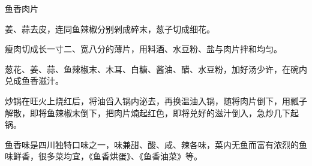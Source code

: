 \begin{recipe}{鱼香肉片}

\begin{ingredients}
\end{ingredients}

\begin{method}
\item 姜、蒜去皮，连同鱼辣椒分别剁成碎末，葱子切成细花。
\item 瘦肉切成长一寸二、宽八分的薄片，用料酒、水豆粉、盐与肉片拌和均匀。
\item
葱花、姜、蒜、鱼辣椒末、木耳、白糖、酱油、醋、水豆粉，加好汤少许，在碗内兑成鱼香滋汁。
\item
炒锅在旺火上烧红后，将油舀入锅内泌去，再换温油入锅，随将肉片倒下，用瓢子解散，即将鱼辣椒末倒下，把肉片煵起红色，即将兑好的滋汁倒入，急炒几下起锅。
\end{method}

\begin{note}
鱼香味是四川独特口味之一，味兼甜、酸、咸、辣各味，菜内无鱼而富有浓烈的鱼味鲜香，很多菜均宜，《鱼香烘蛋》、《鱼香油菜》等。
\end{note}

\end{recipe}

